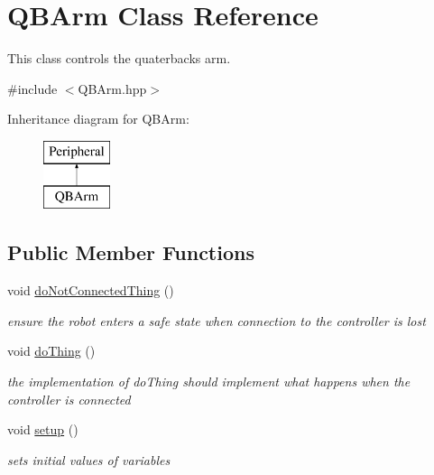\hypertarget{class_q_b_arm}{}\section{Q\+B\+Arm Class Reference}
\label{class_q_b_arm}


This class controls the quaterback\textquotesingle{}s arm.  




{\ttfamily \#include $<$Q\+B\+Arm.\+hpp$>$}

Inheritance diagram for Q\+B\+Arm\+:\begin{figure}[H]
\begin{center}
\leavevmode
\includegraphics[height=2.000000cm]{class_q_b_arm}
\end{center}
\end{figure}
\subsection*{Public Member Functions}
\begin{DoxyCompactItemize}
\item 
\mbox{\label{class_q_b_arm_aa9f699ba82995b84b6b48361d83c3e4f}} 
void \mbox{\hyperlink{class_q_b_arm_aa9f699ba82995b84b6b48361d83c3e4f}{do\+Not\+Connected\+Thing}} ()
\begin{DoxyCompactList}\small\item\em ensure the robot enters a safe state when connection to the controller is lost \end{DoxyCompactList}\item 
\mbox{\label{class_q_b_arm_af1729cc1a588e5d996677bccb6b09237}} 
void \mbox{\hyperlink{class_q_b_arm_af1729cc1a588e5d996677bccb6b09237}{do\+Thing}} ()
\begin{DoxyCompactList}\small\item\em the implementation of do\+Thing should implement what happens when the controller is connected \end{DoxyCompactList}\item 
\mbox{\label{class_q_b_arm_abfef9dc751d9e484f480571aeb875a37}} 
void \mbox{\hyperlink{class_q_b_arm_abfef9dc751d9e484f480571aeb875a37}{setup}} ()
\begin{DoxyCompactList}\small\item\em sets initial values of variables \end{DoxyCompactList}\end{DoxyCompactItemize}


